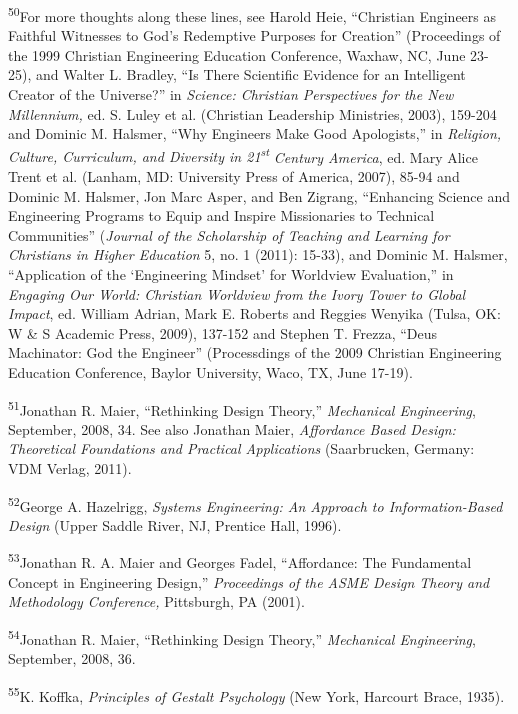 \textsuperscript{50}For more thoughts along these lines, see Harold
Heie, “Christian Engineers as Faithful Witnesses to God’s Redemptive
Purposes for Creation” (Proceedings of the 1999 Christian Engineering
Education Conference, Waxhaw, NC, June 23-25), and Walter L. Bradley,
“Is There Scientific Evidence for an Intelligent Creator of the
Universe?” in \textit{Science: Christian Perspectives for the New
Millennium, }ed. S. Luley et al. (Christian Leadership Ministries,
2003), 159-204\textit{ }and Dominic M. Halsmer, “Why Engineers Make
Good Apologists,” in \textit{Religion, Culture, Curriculum, and
Diversity in 21}\textit{\textsuperscript{st}}\textit{ Century America},
ed. Mary Alice Trent et al. (Lanham, MD: University Press of America,
2007), 85-94 and Dominic M. Halsmer, Jon Marc Asper, and Ben Zigrang,
“Enhancing Science and Engineering Programs to Equip and Inspire
Missionaries to Technical Communities” (\textit{Journal of the
Scholarship of Teaching and Learning for Christians in Higher
Education} 5, no. 1 (2011): 15-33), and\textit{ }Dominic M. Halsmer,
“Application of the ‘Engineering Mindset’ for Worldview Evaluation,” in
\textit{Engaging Our World: Christian Worldview from the Ivory Tower to
Global Impact}, ed. William Adrian, Mark E. Roberts and Reggies Wenyika
(Tulsa, OK: W \& S Academic Press, 2009), 137-152 and Stephen T.
Frezza, “Deus Machinator: God the Engineer” (Processdings of the 2009
Christian Engineering Education Conference, Baylor University, Waco,
TX, June 17-19).


\textsuperscript{51}Jonathan R. Maier, “Rethinking Design Theory,”
\textit{Mechanical Engineering},\textit{ }September, 2008, 34. See also
Jonathan Maier, \textit{Affordance Based Design: Theoretical
Foundations and Practical Applications }(Saarbrucken, Germany: VDM
Verlag, 2011).


\textsuperscript{52}George A. Hazelrigg, \textit{Systems Engineering: An
Approach to Information-Based Design }(Upper Saddle River, NJ, Prentice
Hall, 1996).


\textsuperscript{53}Jonathan R. A. Maier and Georges Fadel, “Affordance:
The Fundamental Concept in Engineering Design,” \textit{Proceedings of
the ASME Design Theory and Methodology Conference, }Pittsburgh, PA
(2001).


\textsuperscript{54}Jonathan R. Maier, “Rethinking Design Theory,”
\textit{Mechanical Engineering},\textit{ }September, 2008, 36.


\textsuperscript{55}K. Koffka, \textit{Principles of Gestalt Psychology
}(New York, Harcourt Brace, 1935).



